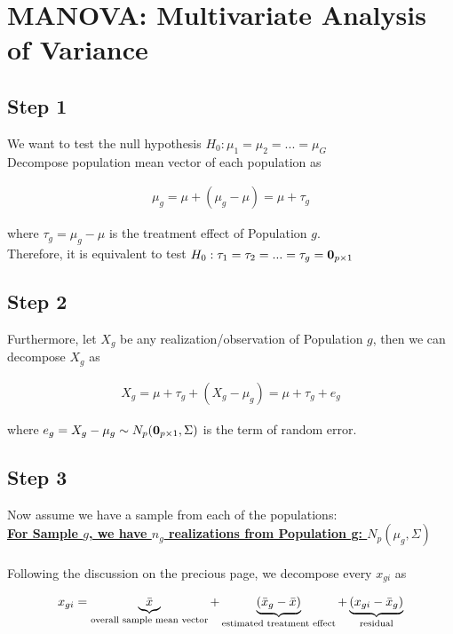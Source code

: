 \documentclass[12pt]{extarticle}
\newcommand{\<}{\langle}
\renewcommand{\>}{\rangle}
\theoremstyle{definition}
\begin{document}
\newpage
\section{MANOVA: Multivariate Analysis of Variance}
\subsection{Step 1}
We want to test the null hypothesis \underline{$H_0: \mu_1 = \mu_2 = ...  = \mu_G$} \\
Decompose population mean vector of each population as\\
\begin{tcolorbox}[enhanced, drop fuzzy shadow, title=Treatment Effect]
\begin{eqnarray*}
\mu_g = \mu + (\mu_g -\mu) = \mu + \tau_g
\end{eqnarray*}
\end{tcolorbox}
where $\tau_g = \mu_g - \mu$ is the treatment effect of Population $g$. \\
Therefore, it is equivalent to test \underline{$H_0: \tau_1 = \tau_2 =...= \tau_g = {\bf 0}_{p \times 1}$} \\


\subsection{Step 2}
Furthermore, let $X_g$ be any realization/observation of Population $g$, then we can decompose $X_g$ as \\
\begin{tcolorbox}[enhanced, drop fuzzy shadow, title=Residual]
\begin{eqnarray*}
X_g = \mu + \tau_g + (X_g - \mu_g) = \mu + \tau_g + e_g
\end{eqnarray*}
\end{tcolorbox}
where $e_g = X_g - \mu_g \sim N_p({\bf 0}_{p \times 1}, \Sigma)$ is the term of random error.


\subsection{Step 3}
Now assume we have a sample from each of the populations: \\
\underline{\bf For Sample $g$, we have $n_g$ realizations from Population g: $N_p (\mu_g, \Sigma)$} \\
\ \\ 
Following the discussion on the precious page, we decompose every $x_{gi}$ as \\
\begin{tcolorbox}[enhanced, drop fuzzy shadow, title=Realization Decomposition]
\begin{eqnarray*}
x_{gi} = \underbrace{\Bar{x}}_\text{overall sample mean vector} + \underbrace{(\Bar{x}_g - \Bar{x})}_\text{estimated treatment effect} + \underbrace{(x_{gi} - \Bar{x}_g)}_\text{residual}
\end{eqnarray*}
\end{tcolorbox}
\end{document}
